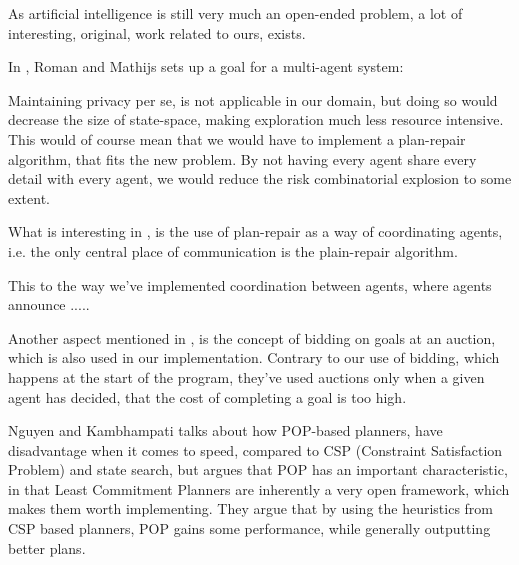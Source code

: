 \documentclass[Main]{subfiles}
\begin{document}
As artificial intelligence is still very much an open-ended problem, a lot of interesting, original, work related to ours, exists.

In \citep{VanderKrogt2005}, Roman and Mathijs sets up a goal for a multi-agent system:

Maintaining privacy per se, is not applicable in our domain, but doing so would decrease the size of state-space, 
making exploration much less resource intensive. 
This would of course mean that we would have to implement a plan-repair algorithm, that fits the new problem.
By not having every agent share every detail with every agent, we would reduce the risk combinatorial explosion to some extent.

What is interesting in \citep{VanderKrogt2005}, is the use of plan-repair as a way of coordinating agents, i.e. the only central place of communication is the plain-repair algorithm.

This  to the way we've implemented coordination between agents, where agents announce ..... 

Another aspect mentioned in \citep{VanderKrogt2005}, is the concept of bidding on goals at an auction, which is also used in our implementation.
Contrary to our use of bidding, which happens at the start of the program, they've used auctions only when a given agent has decided, that the cost of completing a goal is too high.

Nguyen and Kambhampati \citep{Nguyen2001} talks about how POP-based planners, have disadvantage when it comes to speed, compared to CSP (Constraint Satisfaction Problem) and state search, but argues that POP has an important characteristic, in that Least Commitment Planners are inherently a very open framework, which makes them worth implementing. 
They argue that by using the heuristics from CSP based planners, POP gains some performance, while generally outputting better plans.
\end{document}
